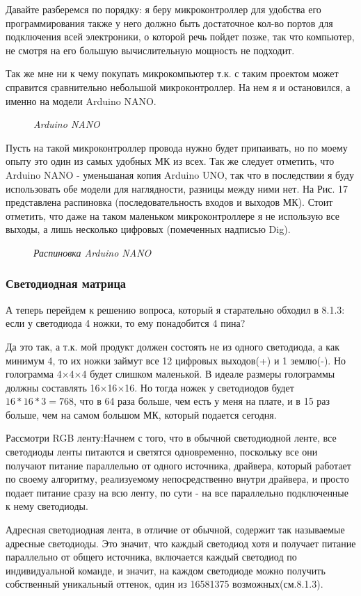 \documentclass[a4paper, 12pt]{article}
\newcommand{\image}[3]{
	\begin{figure}[ht]
		\center{\texttt{[image: img/\#1]} }
		\caption{\textit{#3}}\end{figure}
}
\begin{document}
Давайте разберемся по порядку: я беру микроконтроллер для удобства его
программирования также у него должно быть достаточное кол-во портов для
подключения всей электроники, о которой речь пойдет позже, так что компьютер,
не смотря на его большую вычислительную мощность не подходит.

Так же мне ни к чему покупать микрокомпьютер т.к. с таким проектом может
справится сравнительно небольшой микроконтроллер. На нем я и остановился, а
именно на модели Arduino NANO.

\image{дуня нано2.jpg}{140}{Arduino NANO}

Пусть на такой микроконтроллер провода нужно будет припаивать, но по моему
опыту это один из самых удобных МК из всех. Так же следует отметить, что
Arduino NANO - уменьшаная копия Arduino UNO, так что в последствии я буду
использовать обе модели для наглядности, разницы между ними нет. На Рис. 17
представлена распиновка (последовательность входов и выходов МК). Стоит
отметить, что даже на таком маленьком микроконтроллере я не использую все
выходы, а лишь несколько цифровых (помеченных надписью Dig).

\image{дуня нано.jpg}{150}{Распиновка Arduino NANO}

\subsubsection{Светодиодная матрица}

А теперь перейдем к решению вопроса, который я старательно обходил в 8.1.3:
если у светодиода 4 ножки, то ему понадобится 4 пина?

Да это так, а т.к. мой продукт должен состоять не из одного светодиода, а
как минимум 4, то их ножки займут все 12 цифровых выходов(+) и 1 землю(-).
Но голограмма 4$\times$4$\times$4 будет слишком маленькой. В идеале размеры
голограммы должны составлять 16$\times$16$\times$16. Но тогда ножек у
светодиодов будет $16*16*3=768$, что в 64 раза больше, чем есть у меня на
плате, и в 15 раз больше, чем на самом большом МК, который подается сегодня.

Рассмотри RGB ленту:Начнем с того, что в обычной светодиодной ленте, все светодиоды ленты
питаются и светятся одновременно, поскольку все они получают питание
параллельно от одного источника, драйвера, который работает по своему алгоритму, реализуемому
непосредственно внутри драйвера, и просто подает питание сразу на всю ленту, по сути - на все
параллельно подключенные к нему светодиоды.

Адресная светодиодная лента, в отличие от обычной, содержит так называемые адресные
светодиоды. Это значит, что каждый светодиод хотя и получает питание параллельно от
общего источника, включается каждый светодиод по индивидуальной команде, и значит,
на каждом светодиоде можно получить собственный уникальный оттенок, один из 16581375
возможных(см.8.1.3).
\end{document}
